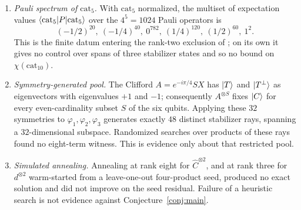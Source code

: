 \documentclass[11pt]{article}
\theoremstyle{plain}
\theoremstyle{definition}
\newcommand{\cat}{\mathrm{cat}}
\begin{document}
\begin{enumerate}[label=(\alph*),leftmargin=*]
\item \emph{Pauli spectrum of $\cat_5$.} With $\cat_5$ normalized, the multiset of
expectation values $\braket{\cat_5|P|\cat_5}$ over the $4^5=1024$ Pauli operators is
\[
(-1/2)^{20},\ (-1/4)^{40},\ 0^{782},\ (1/4)^{120},\ (1/2)^{60},\ 1^{2}.
\]
This is the finite datum entering the rank-two exclusion of \cite{QPG2021}; on its own
it gives no control over spans of three stabilizer states and so no bound on
$\chi(\cat_{10})$.
\item \emph{Symmetry-generated pool.} The Clifford $A=e^{-i\pi/4}SX$ has $\ket T$ and
$\ket{T^\perp}$ as eigenvectors with eigenvalues $+1$ and $-1$; consequently $A^{\otimes S}$
fixes $\ket C$ for every even-cardinality subset $S$ of the six qubits. Applying these
$32$ symmetries to $\varphi_1,\varphi_2,\varphi_3$ generates exactly $48$ distinct
stabilizer rays, spanning a $32$-dimensional subspace. Randomized searches over
products of these rays found no eight-term witness. This is evidence only about that
restricted pool.
\item \emph{Simulated annealing.} Annealing at rank eight for $\widehat C^{\otimes2}$,
and at rank three for $d^{\otimes2}$ warm-started from a leave-one-out four-product
seed, produced no exact solution and did not improve on the seed residual. Failure of a
heuristic search is not evidence against Conjecture~\ref{conj:main}.
\end{enumerate}
\end{document}
